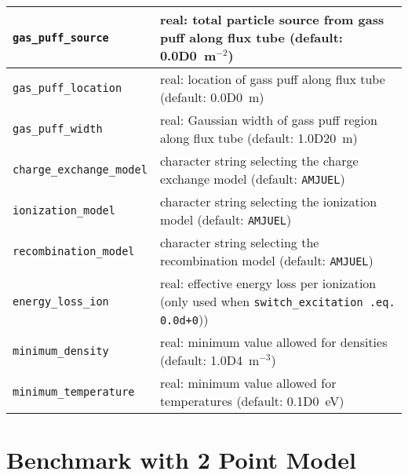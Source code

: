 \documentclass[amsmath,amssymb,a4]{revtex4}
\begin{document}
\begin{table}[h]
\begin{center}
\begin{tabular}{|| l  | l ||}
    {\tt gas\_puff\_source}      & real: total particle source from gass puff along flux tube (default: 0.0D0~m$^{-2}$) \\ \hline
    {\tt gas\_puff\_location}    & real: location of gass puff along flux tube (default: 0.0D0~m) \\ \hline
    {\tt gas\_puff\_width}       & real: Gaussian width of gass puff region along flux tube (default: 1.0D20~m) \\ \hline
    {\tt charge\_exchange\_model}& character string selecting the charge exchange model (default: {\tt AMJUEL}) \\ \hline
    {\tt ionization\_model}      & character string selecting the ionization model (default: {\tt AMJUEL}) \\ \hline
    {\tt recombination\_model}   & character string selecting the recombination model (default: {\tt AMJUEL}) \\ \hline
    {\tt energy\_loss\_ion}      & real: effective energy loss per ionization (only used when {\tt switch\_excitation .eq. 0.0d+0})) \\ \hline
    {\tt minimum\_density}       & real: minimum value allowed for densities (default: 1.0D4~m$^{-3}$) \\ \hline
    {\tt minimum\_temperature}   & real: minimum value allowed for temperatures (default: 0.1D0~eV) \\ \hline
    \hline
  \end{tabular}
\end{center}
\end{table}

\section{Benchmark with 2 Point Model}
\end{document}
